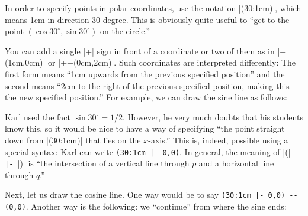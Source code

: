 In order to specify points in polar coordinates, use the notation
|(30:1cm)|, which means 1cm in direction 30 degree. This is obviously
quite useful to ``get to the point $(\cos 30^\circ,\sin 30^\circ)$ on
the circle.'' 

You can add a single |+| sign in front of a coordinate or two of
them as in |+(1cm,0cm)| or |++(0cm,2cm)|. Such coordinates are interpreted
differently: The first form means ``1cm upwards from the previous
specified position'' and the second means ``2cm to the right of the
previous specified position, making this the new specified position.''
For example, we can draw the sine line as follows:

\begin{codeexample}[]
\end{codeexample}

Karl used the fact $\sin 30^\circ = 1/2$. However, he very much
doubts that his students know this, so it would be nice to have a way
of specifying ``the point straight down from |(30:1cm)| that lies on
the $x$-axis.'' This is, indeed, possible using a special syntax: Karl
can write \verb!(30:1cm |- 0,0)!. In general, the meaning of
|(|\verb! |- !|)| is ``the intersection of a vertical
line through $p$ and a horizontal line through $q$.''

Next, let us draw the cosine line. One way would be to say
\verb!(30:1cm |- 0,0) -- (0,0)!. Another way is the following: we
``continue'' from where the sine ends: 

\begin{codeexample}[]
\end{codeexample}

